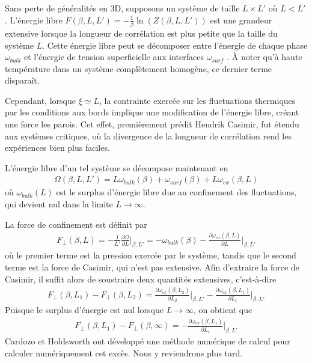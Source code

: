 Sans perte de généralités en 3D, supposons un système de taille $L\times L' $ où $L<L'$. L'énergie libre $F(\beta,L,L') = - \frac{1}{\beta} \ln ( Z(\beta,L,L'))$ est une grandeur extensive lorsque la longueur de corrélation est plus petite que la taille du système $L$. 
Cette énergie libre peut se décomposer entre l'énergie de chaque phase $\omega_{bulk}$ et l'énergie de tension superficielle aux interfaces $\omega_{surf}$ \cite[§4]{cardozo_finite_2015}. À noter qu'à haute température dans un système complètement homogène, ce dernier terme disparaît.

Cependant, lorsque $\xi \simeq L$, la contrainte exercée sur les fluctuations thermiques par les conditions aux bords implique une modification de l'énergie libre, créant une force les parois. Cet effet, premièrement prédit Hendrik Casimir\cite{h_b_g_casimir_attraction_1948}, fut étendu aux systèmes critiques\cite{nikolic_is_2017}, où la divergence de la longueur de corrélation rend les expériences bien plus faciles\cite{nguyen_controlling_2013}.

L'énergie libre d'un tel système se décompose maintenant en 
\begin{align}
    \Omega(\beta,L,L') = L \omega_{bulk}(\beta) + \omega_{surf}(\beta) + L \omega_{ex}(\beta,L)
    \label{decomposition-energie}
\end{align}
où $\omega_{bulk}(L)$ est le surplus d'énergie libre due au confinement des fluctuations, qui devient nul dans la limite $L\to \infty$.

La force de confinement est définit par 
\begin{align}
    F_\perp(\beta,L) = - \frac{1}{L' }\frac{\partial \Omega}{\partial L} \bigg|_{\beta,L'} = -  \omega_{bulk}(\beta) -  \frac{\partial \omega_{ex}(\beta,L)}{\partial L}\bigg|_{\beta,L'}
\end{align}
où le premier terme est la pression exercée par le système, tandis que le second terme est la force de Casimir, qui n'est pas extensive. Afin d'extraire la force de Casimir, il suffit alors de soustraire deux quantités extensives, c'est-à-dire 
\begin{align}
    F_\perp(\beta,L_1) - F_\perp(\beta,L_2) =   \frac{\partial \omega_{ex}(\beta,L_2)}{\partial L_2}\bigg|_{\beta,L'} -  \frac{\partial \omega_{ex}(\beta,L_1)}{\partial L_1}\bigg|_{\beta,L'}
\end{align}
Puisque le surplus d'énergie est nul lorsque $L\to \infty$, on obtient que
\begin{align}
    F_\perp(\beta,L_1) - F_\perp(\beta,\infty) =   -  \frac{\partial \omega_{ex}(\beta,L_1)}{\partial L_1}\bigg|_{\beta,L'}
\end{align}
Cardozo et Holdsworth\cite[§5]{cardozo_finite_2015} ont développé une méthode numérique de calcul pour calculer numériquement cet excès. Nous y reviendrons plus tard.





